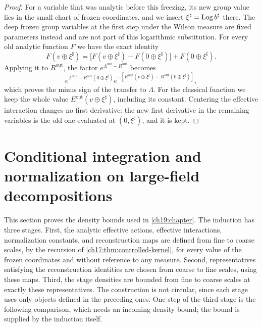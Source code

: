 \begin{proof}
For a variable that was analytic before this freezing, its new group value lies in the small chart of frozen coordinates, and we insert $\xi^\sharp=\operatorname{Log} b^\sharp$ there. The deep frozen group variables at the first step under the Wilson measure are fixed parameters instead and are not part of this logarithmic substitution. For every old analytic function $F$ we have the exact identity
\begin{equation}\label{ch18:eq:full-freeze-identity}
 F(v\oplus\xi^\sharp)
 =\bigl[F(v\oplus\xi^\sharp)
             -F(0\oplus\xi^\sharp)\bigr]
                  +F(0\oplus\xi^\sharp).
\end{equation}
Applying it to $R^{\mathrm{out}}$, the factor $e^{\Lambda^{\mathrm{out}}-R^{\mathrm{out}}}$ becomes
\[
 e^{\Lambda^{\mathrm{out}}
                -R^{\mathrm{out}}(0\oplus\xi^\sharp)}
 e^{-[R^{\mathrm{out}}(v\oplus\xi^\sharp)
                -R^{\mathrm{out}}(0\oplus\xi^\sharp)]},
\]
which proves the minus sign of the transfer to $\Lambda$. For the classical function we keep the whole value $E^{\mathrm{out}}(v\oplus\xi^\sharp)$, including its constant. Centering the effective interaction changes no first derivative: the new first derivative in the remaining variables is the old one evaluated at $(0,\xi^\sharp)$, and it is kept.
\end{proof}

\section{Conditional integration and normalization on large-field decompositions}\label{ch18:sec:induction}

This section proves the density bounds used in \cref{ch19:chapter}. The induction has three stages. First, the analytic effective actions, effective interactions, normalization constants, and reconstruction maps are defined from fine to coarse scales, by the recursion of \cref{ch17:thm:controlled-kernel}, for every value of the frozen coordinates and without reference to any measure. Second, representatives satisfying the reconstruction identities are chosen from coarse to fine scales, using these maps. Third, the stage densities are bounded from fine to coarse scales at exactly these representatives. The construction is not circular, since each stage uses only objects defined in the preceding ones. One step of the third stage is the following comparison, which needs an incoming density bound; the bound is supplied by the induction itself.

